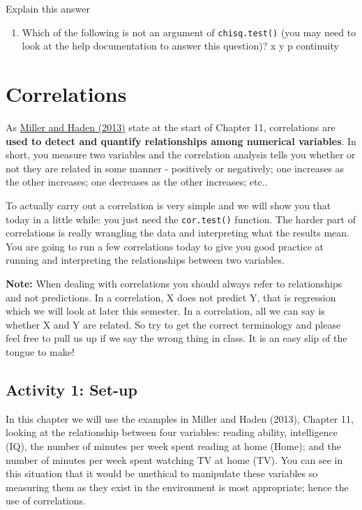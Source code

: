 \documentclass[]{book}
\providecommand{\tightlist}{%
  \setlength{\itemsep}{0pt}\setlength{\parskip}{0pt}}
\begin{document}
Explain this answer

\begin{enumerate}
\def\labelenumi{\arabic{enumi}.}
\setcounter{enumi}{3}
\tightlist
\item
  Which of the following is not an argument of \texttt{chisq.test()} (you may need to look at the help documentation to answer this question)? x y p continuity
\end{enumerate}

\hypertarget{correlations}{%
\chapter{Correlations}\label{correlations}}

As \href{https://drive.google.com/file/d/0B1fyuTuvj3YoaFdUR3FZaXNuNXc/view}{Miller and Haden (2013)} state at the start of Chapter 11, correlations are \textbf{used to detect and quantify relationships among numerical variables}. In short, you measure two variables and the correlation analysis tells you whether or not they are related in some manner - positively or negatively; one increases as the other increases; one decreases as the other increases; etc..

To actually carry out a correlation is very simple and we will show you that today in a little while: you just need the \texttt{cor.test()} function. The harder part of correlations is really wrangling the data and interpreting what the results mean. You are going to run a few correlations today to give you good practice at running and interpreting the relationships between two variables.

\textbf{Note:} When dealing with correlations you should always refer to relationships and not predictions. In a correlation, X does not predict Y, that is regression which we will look at later this semester. In a correlation, all we can say is whether X and Y are related. So try to get the correct terminology and please feel free to pull us up if we say the wrong thing in class. It is an easy slip of the tongue to make!

\hypertarget{activity-1-set-up-5}{%
\section{Activity 1: Set-up}\label{activity-1-set-up-5}}

In this chapter we will use the examples in Miller and Haden (2013), Chapter 11, looking at the relationship between four variables: reading ability, intelligence (IQ), the number of minutes per week spent reading at home (Home); and the number of minutes per week spent watching TV at home (TV). You can see in this situation that it would be unethical to manipulate these variables so measuring them as they exist in the environment is most appropriate; hence the use of correlations.
\end{document}
